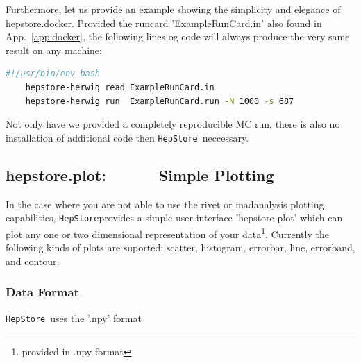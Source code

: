 \documentclass[aps,prd,11pt,tightenlines,superscriptaddress,nofootinbib,preprintnumbers,notitlepage]{revtex4-1}
\newcommand{\hepstore}{\texttt{HepStore}}
\begin{document}
Furthermore, let us provide an example showing the simplicity and
elegance of hepstore.docker. Provided the runcard 'ExampleRunCard.in'
also found in App.~\ref{app:docker}, the following lines og code will
always produce the very same result on any machine:
%
\begin{changemargin}{1.5cm}{1.5cm} 
  \begin{lstlisting}[language=Bash]
    #!/usr/bin/env bash
    hepstore-herwig read ExampleRunCard.in
    hepstore-herwig run  ExampleRunCard.run -N 1000 -s 687\end{lstlisting}
\end{changemargin}
%
Not only have we provided a completely reproducible MC run, there is
also no installation of additional code then \hepstore~neccessary.

\subsection{hepstore.plot:~~~~~~\,Simple Plotting}

In the case where you are not able to use the rivet or madanalysis
plotting capabilities, \hepstore provides a simple user interface
'hepstore-plot' which can plot any one or two dimensional
representation of your data\footnote{provided in .npy
  format}. Currently the following kinds of plots are suported:
scatter, histogram, errorbar, line, errorband, and contour.

\subsubsection{Data Format}

\hepstore~uses the '.npy' format
\end{document}
